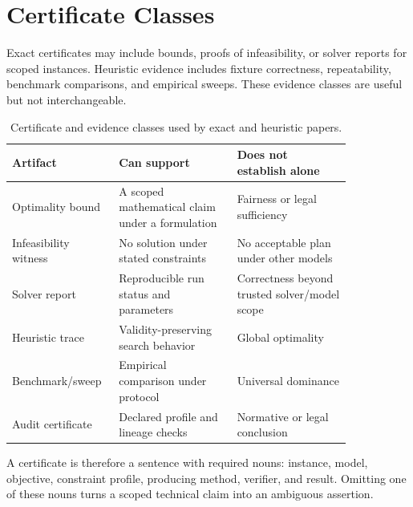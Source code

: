 \section{Certificate Classes}

Exact certificates may include bounds, proofs of infeasibility, or solver
reports for scoped instances. Heuristic evidence includes fixture correctness,
repeatability, benchmark comparisons, and empirical sweeps. These evidence
classes are useful but not interchangeable.

\begin{table}[htbp]
\centering
\small
\begin{tabular}{p{0.21\linewidth}p{0.32\linewidth}p{0.31\linewidth}}
\toprule
Artifact & Can support & Does not establish alone \\
\midrule
Optimality bound & A scoped mathematical claim under a formulation & Fairness or legal sufficiency \\
Infeasibility witness & No solution under stated constraints & No acceptable plan under other models \\
Solver report & Reproducible run status and parameters & Correctness beyond trusted solver/model scope \\
Heuristic trace & Validity-preserving search behavior & Global optimality \\
Benchmark/sweep & Empirical comparison under protocol & Universal dominance \\
Audit certificate & Declared profile and lineage checks & Normative or legal conclusion \\
\bottomrule
\end{tabular}
\caption{Certificate and evidence classes used by exact and heuristic papers.}
\end{table}

A certificate is therefore a sentence with required nouns: instance, model,
objective, constraint profile, producing method, verifier, and result. Omitting
one of these nouns turns a scoped technical claim into an ambiguous assertion.
